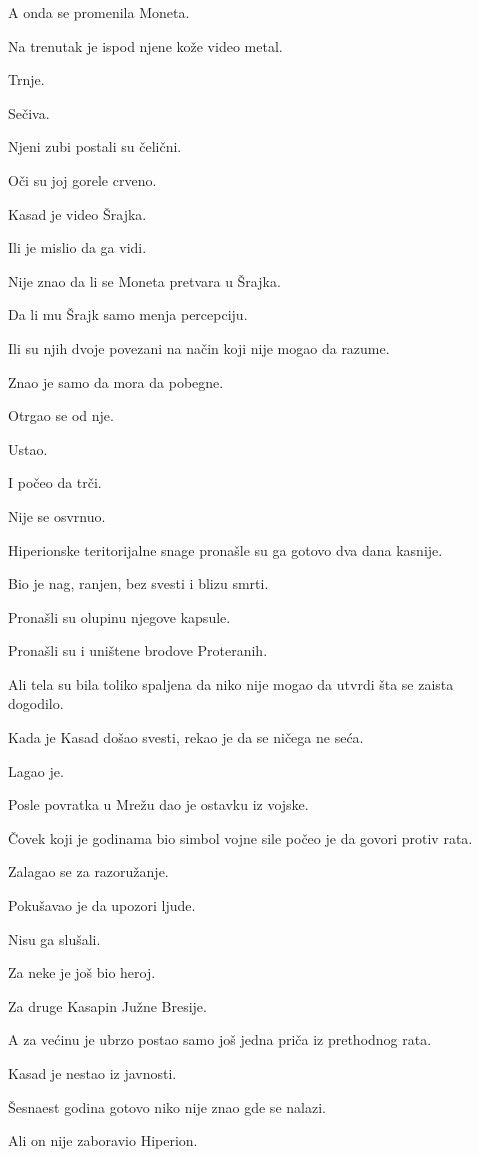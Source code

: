 A onda se promenila Moneta.

Na trenutak je ispod njene kože video metal.

Trnje.

Sečiva.

Njeni zubi postali su čelični.

Oči su joj gorele crveno.

Kasad je video Šrajka.

Ili je mislio da ga vidi.

Nije znao da li se Moneta pretvara u Šrajka.

Da li mu Šrajk samo menja percepciju.

Ili su njih dvoje povezani na način koji nije mogao da razume.

Znao je samo da mora da pobegne.

Otrgao se od nje.

Ustao.

I počeo da trči.

Nije se osvrnuo.

\bigskip

Hiperionske teritorijalne snage pronašle su ga gotovo dva dana kasnije.

Bio je nag, ranjen, bez svesti i blizu smrti.

Pronašli su olupinu njegove kapsule.

Pronašli su i uništene brodove Proteranih.

Ali tela su bila toliko spaljena da niko nije mogao da utvrdi šta se zaista dogodilo.

Kada je Kasad došao svesti, rekao je da se ničega ne seća.

Lagao je.

Posle povratka u Mrežu dao je ostavku iz vojske.

Čovek koji je godinama bio simbol vojne sile počeo je da govori protiv rata.

Zalagao se za razoružanje.

Pokušavao je da upozori ljude.

Nisu ga slušali.

Za neke je još bio heroj.

Za druge Kasapin Južne Bresije.

A za većinu je ubrzo postao samo još jedna priča iz prethodnog rata.

Kasad je nestao iz javnosti.

Šesnaest godina gotovo niko nije znao gde se nalazi.

Ali on nije zaboravio Hiperion.

